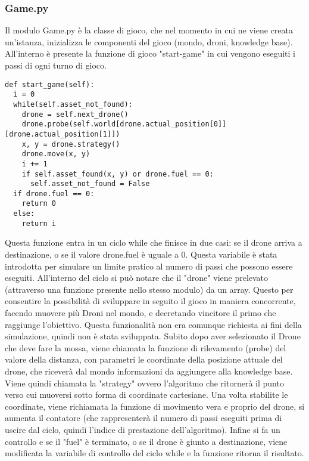 \subsubsection{Game.py}
Il modulo Game.py è la classe di gioco, che nel momento in cui ne viene creata un'istanza, inizializza le componenti del gioco (mondo, droni, knowledge base). All'interno è presente la funzione di gioco "start-game" in cui vengono eseguiti i passi di ogni turno di gioco. 
\begin{verbatim}
def start_game(self):
  i = 0
  while(self.asset_not_found):
    drone = self.next_drone()
    drone.probe(self.world[drone.actual_position[0]][drone.actual_position[1]])
    x, y = drone.strategy()
    drone.move(x, y)
    i += 1
    if self.asset_found(x, y) or drone.fuel == 0:
      self.asset_not_found = False
  if drone.fuel == 0:
    return 0
  else:
    return i
\end{verbatim}
Questa funzione entra in un ciclo while che finisce in due casi: se il drone arriva a destinazione, o se il valore drone.fuel è uguale a 0. Questa variabile è stata introdotta per simulare un limite pratico al numero di passi che possono essere eseguiti. All'interno del ciclo si può notare che il "drone" viene prelevato (attraverso una funzione presente nello stesso modulo) da un array. Questo per consentire la possibilità di sviluppare in seguito il gioco in maniera concorrente, facendo muovere più Droni nel mondo, e decretando vincitore il primo che raggiunge l'obiettivo. Questa funzionalità non era comunque richiesta ai fini della simulazione, quindi non è stata sviluppata. Subito dopo aver selezionato il Drone che deve fare la mossa, viene chiamata la funzione di rilevamento (probe) del valore della distanza, con parametri le coordinate della posizione attuale del drone, che riceverà dal mondo informazioni da aggiungere alla knowledge base. Viene quindi chiamata la "strategy" ovvero l'algoritmo che ritornerà il punto verso cui muoversi sotto forma di coordinate cartesiane. Una volta stabilite le coordinate, viene richiamata la funzione di movimento vera e proprio del drone, si aumenta il contatore (che rappresenterà il numero di passi eseguiti prima di uscire dal ciclo, quindi l'indice di prestazione dell'algoritmo). Infine si fa un controllo e se il "fuel" è terminato, o se il drone è giunto a destinazione, viene modificata la variabile di controllo del ciclo while e la funzione ritorna il risultato.

